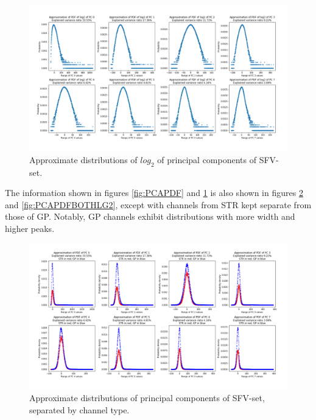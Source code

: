 \documentclass{kththesis}
\begin{document}
\begin{figure}[H]
    \centering
    \centerline{\includegraphics[width=1\textwidth]{images/PCA/PCAPDFLG2.png}}
    \caption{Approximate distributions of \begin{math}log_2\end{math} of principal components of SFV-set.}
    \label{fig:PCAPDFLG2}
\end{figure}

The information shown in figures \ref{fig:PCAPDF} and \ref{fig:PCAPDFLG2} is also shown in figures \ref{fig:PCAPDFBOTH} and \ref{fig:PCAPDFBOTHLG2}, except with channels from STR kept separate from those of GP.
Notably, GP channels exhibit distributions with more width and higher peaks.

\begin{figure}[H]
    \centering
    \centerline{\includegraphics[width=1\textwidth]{images/PCA/PCABOTH.png}}
    \caption{Approximate distributions of principal components of SFV-set, separated by channel type.}
    \label{fig:PCAPDFBOTH}
\end{figure}
\end{document}
